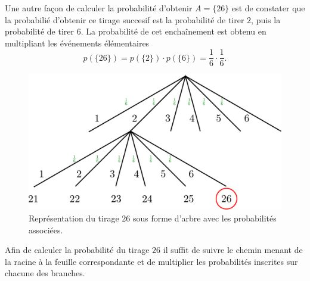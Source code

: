 \documentclass[a4paper,12pt]{book}
\begin{document}
Une autre façon de calculer la probabilité d'obtenir $A=\{26\}$ est de constater que la probabilié 
d'obtenir ce tirage succesif est la probabilité de tirer $2$, puis la probabilité de tirer $6$. La probabilité
de cet enchaînement est obtenu en multipliant les événements élémentaires
\begin{equation}
 p(\{26\})=p(\{2\})\cdot p(\{6\})=\frac{1}{6}\cdot\frac{1}{6}.
\end{equation}
\begin{figure}[htp]
\includegraphics[width=\textwidth]{figs/arbre2.pdf}
\caption{Représentation du tirage $26$ sous forme d'arbre avec les probabilités associées.}\label{fig_arbre2}
\end{figure}
Afin de calculer la probabilité du tirage $26$ il suffit de suivre le chemin menant de la racine à la feuille correspondante
et de multiplier les probabilités inscrites sur chacune des branches.
\end{document}
